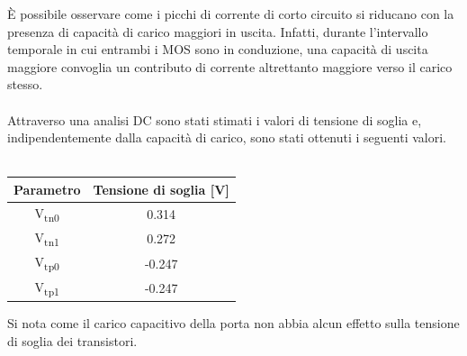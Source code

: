 \documentclass[11pt,  english, makeidx, a4paper, titlepage, oneside]{book}
\begin{document}
È possibile osservare come i picchi di corrente di corto circuito si riducano con la presenza di capacità di carico maggiori in uscita. Infatti, durante l'intervallo temporale in cui entrambi i MOS sono in conduzione, una capacità di uscita maggiore convoglia un contributo di corrente altrettanto maggiore verso il carico stesso.
\\\\
Attraverso una analisi DC sono stati stimati i valori di tensione di soglia e, indipendentemente dalla capacità di carico, sono stati ottenuti i seguenti valori.
\\\\
\begin{center}
	\begin{tabular}{|c|c|}
	\hline
	Parametro & Tensione di soglia [V] \\
	\hline
	 V\textsubscript{tn0} & 0.314\\
	\hline
	 V\textsubscript{tn1} & 0.272 \\
	\hline
	V\textsubscript{tp0} & -0.247 \\
	\hline
	V\textsubscript{tp1} & -0.247 \\
	\hline
	\end{tabular}	
\end{center}
\vspace{0.3cm}
Si nota come il carico capacitivo della porta non abbia alcun effetto sulla tensione di soglia dei transistori.
\end{document}
